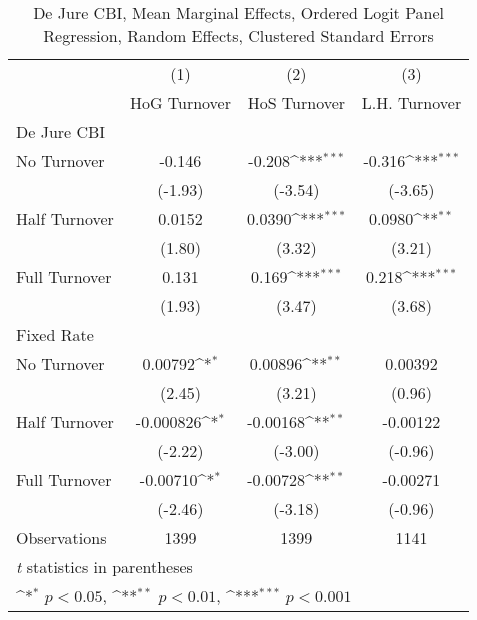 \begin{table}[htbp]\centering
\def\sym#1{\ifmmode^{#1}\else\(^{#1}\)\fi}
\caption{De Jure CBI, Mean Marginal Effects, Ordered Logit Panel Regression, Random Effects, Clustered Standard Errors \label{ordLogDJ}}
\begin{tabular}{l*{3}{c}}
\toprule
                                        &\multicolumn{1}{c}{(1)}&\multicolumn{1}{c}{(2)}&\multicolumn{1}{c}{(3)}\\
                                        &\multicolumn{1}{c}{HoG Turnover}&\multicolumn{1}{c}{HoS Turnover}&\multicolumn{1}{c}{L.H. Turnover}\\
\midrule
De Jure CBI                             &                  &                  &                  \\
No Turnover                             &   -0.146         &   -0.208\sym{***}&   -0.316\sym{***}\\
                                        &  (-1.93)         &  (-3.54)         &  (-3.65)         \\
\addlinespace
Half Turnover                           &   0.0152         &   0.0390\sym{***}&   0.0980\sym{**} \\
                                        &   (1.80)         &   (3.32)         &   (3.21)         \\
\addlinespace
Full Turnover                           &    0.131         &    0.169\sym{***}&    0.218\sym{***}\\
                                        &   (1.93)         &   (3.47)         &   (3.68)         \\
\midrule
Fixed Rate                              &                  &                  &                  \\
No Turnover                             &  0.00792\sym{*}  &  0.00896\sym{**} &  0.00392         \\
                                        &   (2.45)         &   (3.21)         &   (0.96)         \\
\addlinespace
Half Turnover                           &-0.000826\sym{*}  & -0.00168\sym{**} & -0.00122         \\
                                        &  (-2.22)         &  (-3.00)         &  (-0.96)         \\
\addlinespace
Full Turnover                           & -0.00710\sym{*}  & -0.00728\sym{**} & -0.00271         \\
                                        &  (-2.46)         &  (-3.18)         &  (-0.96)         \\
\midrule
Observations                            &     1399         &     1399         &     1141         \\
\bottomrule
\multicolumn{4}{l}{\footnotesize \textit{t} statistics in parentheses}\\
\multicolumn{4}{l}{\footnotesize \sym{*} \(p<0.05\), \sym{**} \(p<0.01\), \sym{***} \(p<0.001\)}\\
\end{tabular}
\end{table}
